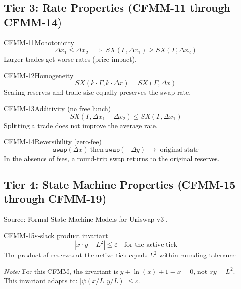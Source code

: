 \subsection{Tier 3: Rate Properties (CFMM-11 through CFMM-14)}

\begin{invariant}{CFMM-11}{Monotonicity}
\[
  \Delta x_1 \leq \Delta x_2 \;\implies\; SX(\Gamma, \Delta x_1) \geq SX(\Gamma, \Delta x_2)
\]
Larger trades get worse rates (price impact).
\end{invariant}

\begin{invariant}{CFMM-12}{Homogeneity}
\[
  SX(k \cdot \Gamma, k \cdot \Delta x) = SX(\Gamma, \Delta x)
\]
Scaling reserves and trade size equally preserves the swap rate.
\end{invariant}

\begin{invariant}{CFMM-13}{Additivity (no free lunch)}
\[
  SX(\Gamma, \Delta x_1 + \Delta x_2) \leq SX(\Gamma, \Delta x_1)
\]
Splitting a trade does not improve the average rate.
\end{invariant}

\begin{invariant}{CFMM-14}{Reversibility (zero-fee)}
\[
  \texttt{swap}(\Delta x) \;\text{then}\; \texttt{swap}(-\Delta y)
  \;\longrightarrow\; \text{original state}
\]
In the absence of fees, a round-trip swap returns to the original reserves.
\end{invariant}

\subsection{Tier 4: State Machine Properties (CFMM-15 through CFMM-19)}

Source: Formal State-Machine Models for Uniswap v3 \cite{fsm2024uniswap}.

\begin{invariant}{CFMM-15}{$\varepsilon$-slack product invariant}
\[
  |x \cdot y - L^2| \leq \varepsilon \quad \text{for the active tick}
\]
The product of reserves at the active tick equals $L^2$ within rounding tolerance.

\textit{Note:} For this CFMM, the invariant is $y + \ln(x) + 1 - x = 0$, not $xy = L^2$.
This invariant adapts to: $|\psi(x/L, y/L)| \leq \varepsilon$.
\end{invariant}

